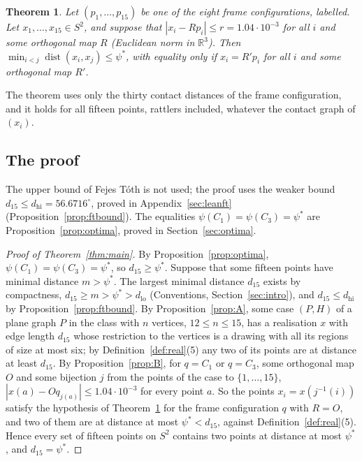 \documentclass[12pt]{amsart}
\theoremstyle{definition}
\newcounter{mainthm}
\theoremstyle{plain}
\newtheorem{maintheorem}[mainthm]{Theorem}
\theoremstyle{definition}
\newcommand{\R}{\mathbb{R}}
\newcommand{\Sph}{S^2}
\newcommand{\dist}{\operatorname{dist}}
\newcommand{\psis}{\psi^{*}}
\newcommand{\dlo}{d_{\mathrm{lo}}}
\newcommand{\dhi}{d_{\mathrm{hi}}}
\newcommand{\CI}{C_1}
\newcommand{\CIII}{C_3}
\newcommand{\leanmap}[1]{\ignorespaces}
\newcommand{\mapnote}[1]{\ignorespaces}
\begin{document}
\begin{maintheorem}\label{thm:local}\leanmap{Tammes15.PaperSteps.local_optimality_frame, Tammes15.local_optimality, Tammes15.PaperSteps.local_optimality_strict, Tammes15.radius_ok, Tammes15.radius_sq_ok, Tammes15.root_lt}\mapnote{as stated, with its equality case, for every labelling of each of the eight frame configurations; the second declaration is the inequality for any labelled configuration of $n$ points with contacts at inner product $u>0$ whose constant $\kappa$ is at least $\kappa_0$, and any $r$ with $\sqrt n\,r\cdot1.01(1+u)\le\kappa_0$ and $nr^2<0.02$; the third gives, when the first condition is strict, that the points are an orthogonal image of the configuration or some contact pair has inner product above $u$}
Let $(p_1,\dots,p_{15})$ be one of the eight frame configurations, labelled. Let $x_1,\dots,x_{15}\in\Sph$, and suppose that $|x_i-Rp_i|\le r=1.04\cdot10^{-3}$ for all $i$ and some orthogonal map $R$ (Euclidean norm in $\R^3$). Then $\min_{i<j}\dist(x_i,x_j)\le\psis$, with equality only if $x_i=R'p_i$ for all $i$ and some orthogonal map $R'$.
\end{maintheorem}

The theorem uses only the thirty contact distances of the frame configuration, and it holds for all fifteen points, rattlers included, whatever the contact graph of $(x_i)$.

\subsection{The proof}
The upper bound of Fejes T\'oth is not used; the proof uses the weaker bound $d_{15}\le\dhi=56.6716^\circ$, proved in Appendix~\ref{sec:leanft} (Proposition~\ref{prop:ftbound}). The equalities $\psi(\CI)=\psi(\CIII)=\psis$ are Proposition~\ref{prop:optima}, proved in Section~\ref{sec:optima}.

\begin{proof}[Proof of Theorem~\ref{thm:main}]
By Proposition~\ref{prop:optima}, $\psi(\CI)=\psi(\CIII)=\psis$, so $d_{15}\ge\psis$. Suppose that some fifteen points have minimal distance $m>\psis$. The largest minimal distance $d_{15}$ exists by compactness, $d_{15}\ge m>\psis>\dlo$ (Conventions, Section~\ref{sec:intro}), and $d_{15}\le\dhi$ by Proposition~\ref{prop:ftbound}. By Proposition~\ref{prop:A}, some case $(P,H)$ of a plane graph $P$ in the class with $n$ vertices, $12\le n\le15$, has a realisation $x$ with edge length $d_{15}$ whose restriction to the vertices is a drawing with all its regions of size at most six; by Definition~\ref{def:real}(5) any two of its points are at distance at least $d_{15}$. By Proposition~\ref{prop:B}, for $q=\CI$ or $q=\CIII$, some orthogonal map $O$ and some bijection $j$ from the points of the case to $\{1,\dots,15\}$, $|x(a)-Oq_{j(a)}|\le1.04\cdot10^{-3}$ for every point $a$. So the points $x_i=x(j^{-1}(i))$ satisfy the hypothesis of Theorem~\ref{thm:local} for the frame configuration $q$ with $R=O$, and two of them are at distance at most $\psis<d_{15}$, against Definition~\ref{def:real}(5). Hence every set of fifteen points on $\Sph$ contains two points at distance at most $\psis$, and $d_{15}=\psis$.
\end{proof}
\end{document}
